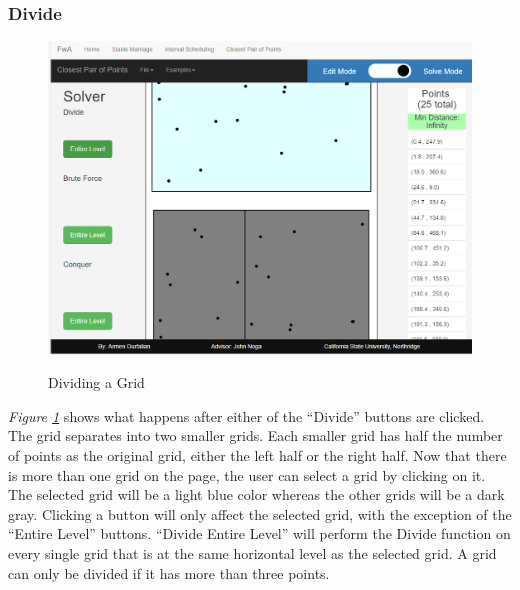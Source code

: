 \subsubsection{Divide}
\begin{figure}[H]
	\caption{Dividing a Grid}
	\includegraphics[width=\linewidth]
	{images/closest-pair-of-points/cpop-divide.png}
	\label{fig-cpop-divide}
	\centering
\end{figure}
\hspace{-0.3in}
\textit{Figure \ref{fig-cpop-divide}} shows what happens after either of the
``Divide'' buttons are clicked. 
The grid separates into two smaller grids. 
Each smaller grid has half the number of points as the original grid, either
the left half or the right half.
Now that there is more than one grid on the page, the user can select a grid
by clicking on it. The selected grid will be a light blue color whereas the 
other grids will be a dark gray. Clicking a button will only affect the 
selected grid, with the exception of the ``Entire Level'' buttons. 
``Divide Entire Level'' will perform the Divide function on 
every single grid that is at the same horizontal level as the selected grid. 
A grid can only be divided if it has more than three points. 
